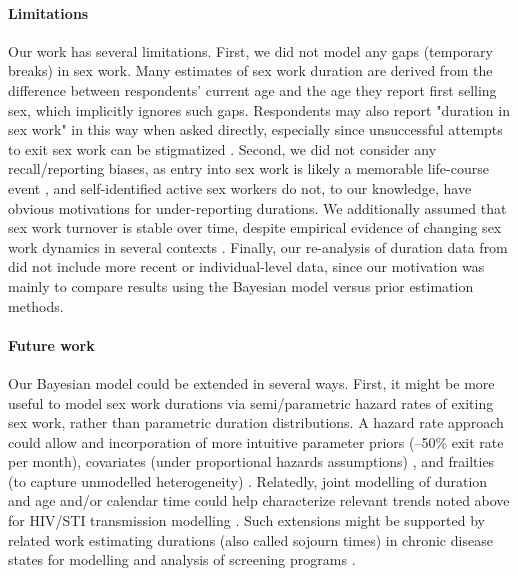 \paragraph{Limitations}
Our work has several limitations.
First, we did not model any gaps (temporary breaks) in sex work.
Many estimates of sex work duration are derived from
the difference between respondents' current age and the age they report first selling sex,
which implicitly ignores such gaps.
Respondents may also report "duration in sex work" in this way when asked directly,
especially since unsuccessful attempts to exit sex work can be stigmatized \cite{Lora2025}.
Second, we did not consider any recall/reporting biases,
as entry into sex work is likely a memorable life-course event
\cite{Sandy2025,Cimino2017,Ingabire2012,Bowen2011,Lora2025},
and self-identified active sex workers do not, to our knowledge, have
obvious motivations for under-reporting durations.
We additionally assumed that sex work turnover is stable over time,
despite empirical evidence of changing sex work dynamics in several contexts
\cite{Anderegg2024,Anderson2026}.
Finally, our re-analysis of duration data from \cite{Fazito2012}
did not include more recent or individual-level data,
since our motivation was mainly to compare
results using the Bayesian model versus prior estimation methods.
\paragraph{Future work}
Our Bayesian model could be extended in several ways.
First, it might be more useful to model sex work durations
via semi/parametric hazard rates of exiting sex work,
rather than parametric duration distributions.
A hazard rate approach could allow and incorporation of
more intuitive parameter priors (--50\% exit rate per month),
covariates (\eg under proportional hazards assumptions) \cite{Kalbfleisch2023}, and
frailties (\eg to capture unmodelled heterogeneity) \cite{Balan2020}.
Relatedly, joint modelling of duration and age and/or calendar time
could help characterize relevant trends noted above
\eg for HIV/STI transmission modelling \cite{Anderegg2024,Anderson2026}.
Such extensions might be supported by related work estimating
durations (also called sojourn times) in chronic disease states
for modelling and analysis of screening programs \cite{Zelen1969}.
